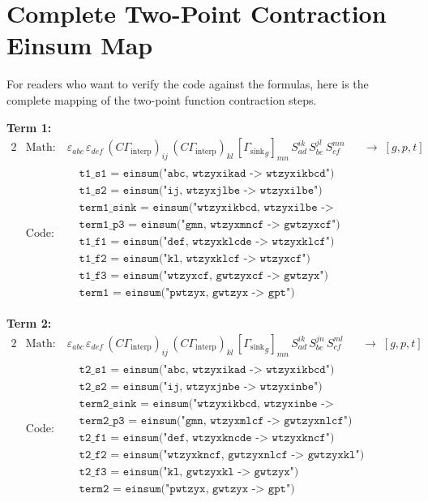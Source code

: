 \documentclass[11pt,a4paper]{article}
\newcommand{\eps}{\varepsilon}
\newcommand{\Gint}{\Gamma_{\text{interp}}}
\newcommand{\Gsink}{\Gamma_{\text{sink}}}
\newcommand{\Cmat}{C}
\newcommand{\fwprop}{S}
\begin{document}
\section{Complete Two-Point Contraction Einsum Map}

For readers who want to verify the code against the formulas, here is the
complete mapping of the two-point function contraction steps.

\medskip\noindent
\textbf{Term 1:}
\begin{alignat}{2}
  &\text{Math:}\quad
    \eps_{abc}\,\eps_{def}\,
    (\Cmat\Gint)_{ij}\,(\Cmat\Gint)_{kl}\,
    [{\Gsink}_{g}]_{mn}\,
    \fwprop^{ik}_{ad}\,
    \fwprop^{jl}_{be}\,
    \fwprop^{mn}_{cf}
    &&\longrightarrow\; [g,p,t] \\
  &\text{Code:}\quad
    \begin{aligned}
      &\texttt{t1\_s1 = einsum("abc, wtzyxikad -> wtzyxikbcd")} \\
      &\texttt{t1\_s2 = einsum("ij, wtzyxjlbe -> wtzyxilbe")} \\
      &\texttt{term1\_sink = einsum("wtzyxikbcd, wtzyxilbe -> wtzyxklcde")} \\
      &\texttt{term1\_p3 = einsum("gmn, wtzyxmncf -> gwtzyxcf")} \\
      &\texttt{t1\_f1 = einsum("def, wtzyxklcde -> wtzyxklcf")} \\
      &\texttt{t1\_f2 = einsum("kl, wtzyxklcf -> wtzyxcf")} \\
      &\texttt{t1\_f3 = einsum("wtzyxcf, gwtzyxcf -> gwtzyx")} \\
      &\texttt{term1 = einsum("pwtzyx, gwtzyx -> gpt")}
    \end{aligned}
\end{alignat}

\medskip\noindent
\textbf{Term 2:}
\begin{alignat}{2}
  &\text{Math:}\quad
    \eps_{abc}\,\eps_{def}\,
    (\Cmat\Gint)_{ij}\,(\Cmat\Gint)_{kl}\,
    [{\Gsink}_{g}]_{mn}\,
    \fwprop^{ik}_{ad}\,
    \fwprop^{jn}_{be}\,
    \fwprop^{ml}_{cf}
    &&\longrightarrow\; [g,p,t] \\
  &\text{Code:}\quad
    \begin{aligned}
      &\texttt{t2\_s1 = einsum("abc, wtzyxikad -> wtzyxikbcd")} \\
      &\texttt{t2\_s2 = einsum("ij, wtzyxjnbe -> wtzyxinbe")} \\
      &\texttt{term2\_sink = einsum("wtzyxikbcd, wtzyxinbe -> wtzyxkncde")} \\
      &\texttt{term2\_p3 = einsum("gmn, wtzyxmlcf -> gwtzyxnlcf")} \\
      &\texttt{t2\_f1 = einsum("def, wtzyxkncde -> wtzyxkncf")} \\
      &\texttt{t2\_f2 = einsum("wtzyxkncf, gwtzyxnlcf -> gwtzyxkl")} \\
      &\texttt{t2\_f3 = einsum("kl, gwtzyxkl -> gwtzyx")} \\
      &\texttt{term2 = einsum("pwtzyx, gwtzyx -> gpt")}
    \end{aligned}
\end{alignat}
\end{document}
